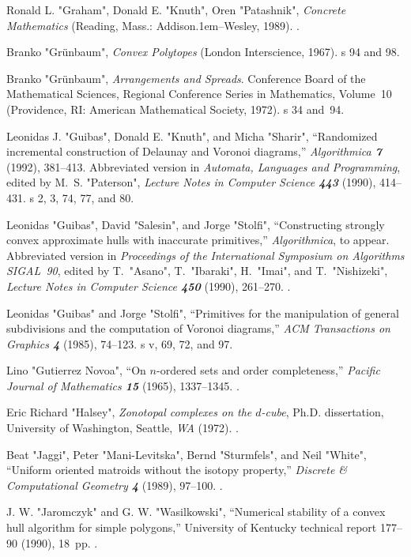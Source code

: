 \bib[33]
Ronald L. "Graham", Donald E. "Knuth", Oren "Patashnik", {\sl Concrete
Mathematics\/} (Reading, Mass.: Addison\kern.1em--Wesley, 1989).
.

\bib[34]
Branko "Gr\"unbaum", {\sl Convex Polytopes\/} (London Interscience, 1967).
\>s 94 and 98.

\bib[35]
Branko "Gr\"unbaum", {\sl Arrangements and Spreads}. Conference Board of
the Math\-e\-matical Sciences, Regional Conference Series in Mathematics,
Volume~10 (Prov\-i\-dence, {\ninerm RI}: American Mathematical Society, 1972).
\>s 34 and~94.

\bib[36]
Leonidas J. "Guibas", Donald E. "Knuth", and Micha "Sharir", ``Randomized
incremental construction of Delaunay and Voronoi diagrams,''
 {\sl Algorithmica\/ \bf7} (1992), 381--413.
Abbreviated version in {\sl Automata, Languages and Programming},
 edited by M.~S. "Paterson", {\sl Lecture Notes in Computer Science\/ \bf443}
 (1990), 414--431.
\>s 2, 3, 74, 77, and 80.

\bib[37]
Leonidas "Guibas", David "Salesin", and Jorge "Stolfi", ``Constructing
strongly convex approximate hulls with inaccurate primitives,''
{\sl Algorithmica}, to appear. Abbreviated version in
{\sl Proceedings of the International Symposium on Algorithms SIGAL~90},
edited by T.~"Asano", T.~"Ibaraki", H.~"Imai", and T.~"Nishizeki",
{\sl Lecture Notes in Computer Science\/ \bf 450} (1990), 261--270.
.

\bib[38]
Leonidas "Guibas" and Jorge "Stolfi", ``Primitives for the manipulation of
general subdivisions and the computation of Voronoi diagrams,'' {\sl
ACM Transactions on Graphics\/ \bf 4} (1985), 74--123.
\>s v, 69, 72, and 97.

\bib[39]
Lino "Gutierrez Novoa", ``On $n$-ordered sets and order completeness,''
{\sl Pacific Journal of Mathematics\/ \bf 15} (1965), 1337--1345.
.

\bib[40]
Eric Richard "Halsey", {\sl Zonotopal complexes on the $d$-cube},
Ph.D. dissertation, University of Washington, Seattle, {\sl WA} (1972).
.

\bib[41]
Beat "Jaggi", Peter "Mani-Levitska", Bernd "Sturmfels", and Neil "White",
``Uniform oriented matroids without the isotopy property,'' {\sl
Discrete \& Computational Geometry\/ \bf 4} (1989), 97--100.
.

\bib[42]
J. W. "Jaromczyk" and G. W. "Wasilkowski", ``Numerical stability of a
convex hull algorithm for simple polygons,'' University of Kentucky
technical report 177--90 (1990), 18~pp.
.

